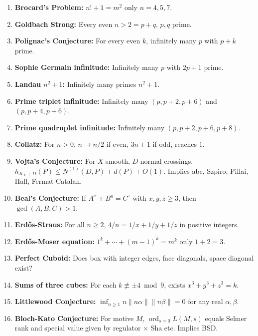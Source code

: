 \documentclass[aps,prd,amsmath,amssymb,twocolumn,superscriptaddress]{revtex4-2}
\begin{document}
\begin{enumerate}[label={\bf \arabic*.}, leftmargin=*, itemsep=2pt]
\item \textbf{Brocard's Problem:} $n!+1=m^2$ only $n=4,5,7$.

\item \textbf{Goldbach Strong:} Every even $n>2 = p+q$, $p,q$ prime.

\item \textbf{Polignac's Conjecture:} For every even $k$, infinitely many $p$ with $p+k$ prime.

\item \textbf{Sophie Germain infinitude:} Infinitely many $p$ with $2p+1$ prime.

\item \textbf{Landau $n^2+1$:} Infinitely many primes $n^2+1$.

\item \textbf{Prime triplet infinitude:} Infinitely many $(p,p+2,p+6)$ and $(p,p+4,p+6)$.

\item \textbf{Prime quadruplet infinitude:} Infinitely many $(p,p+2,p+6,p+8)$.

\item \textbf{Collatz:} For $n>0$, $n\to n/2$ if even, $3n+1$ if odd, reaches $1$.

\item \textbf{Vojta's Conjecture:} For $X$ smooth, $D$ normal crossings, $h_{K_X+D}(P)\le N^{(1)}(D,P)+d(P)+O(1)$. Implies abc, Szpiro, Pillai, Hall, Fermat-Catalan.

\item \textbf{Beal's Conjecture:} If $A^x+B^y=C^z$ with $x,y,z\ge3$, then $\gcd(A,B,C)>1$.

\item \textbf{Erd\H{o}s-Straus:} For all $n\ge2$, $4/n=1/x+1/y+1/z$ in positive integers.

\item \textbf{Erd\H{o}s-Moser equation:} $1^k+\cdots+(m-1)^k=m^k$ only $1+2=3$.

\item \textbf{Perfect Cuboid:} Does box with integer edges, face diagonals, space diagonal exist?

\item \textbf{Sums of three cubes:} For each $k\not\equiv\pm4\bmod9$, exists $x^3+y^3+z^3=k$.

\item \textbf{Littlewood Conjecture:} $\inf_{n\ge1} n\|n\alpha\|\|n\beta\|=0$ for any real $\alpha,\beta$.

\item \textbf{Bloch-Kato Conjecture:} For motive $M$, $\operatorname{ord}_{s=0}L(M,s)$ equals Selmer rank and special value given by regulator $\times$ Sha etc. Implies BSD.


\end{enumerate}
\end{document}

